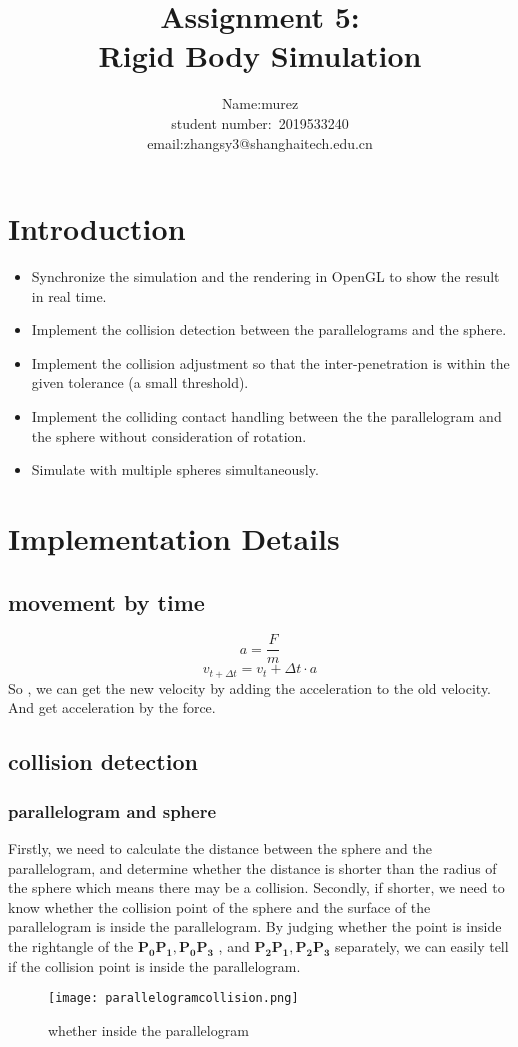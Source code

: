 \documentclass[acmtog]{acmart}
\title{Assignment 5:\\ {Rigid Body Simulation}}
\author{Name:\quad murez  \\ student number:\ 2019533240
\\email:\quad zhangsy3@shanghaitech.edu.cn}
\begin{document}
\maketitle

\vspace*{2 ex}

\section{Introduction}
\begin{itemize}
\item Synchronize the simulation and the rendering in OpenGL to show the result in real time.
\item Implement the collision detection between the parallelograms and the sphere.
\item Implement the collision adjustment so that the inter-penetration is within the given tolerance (a small threshold).
\item Implement the colliding contact handling between the the parallelogram and the sphere without consideration of rotation.
\item Simulate with multiple spheres simultaneously.
\end{itemize}
\section{Implementation Details}
\subsection{movement by time}

\[
	a = \frac{F}{m}
\]
\[
	v_{t+\Delta t} = v_{t} + \Delta t \cdot a
\]
So , we can get the new velocity by adding the acceleration to the old velocity. And get acceleration by the force.
\subsection{collision detection}
\subsubsection{parallelogram and sphere}
Firstly, we need to calculate the distance between the sphere and the parallelogram, and determine whether the distance is shorter than the radius of the sphere which means there may be a collision.
Secondly, if shorter, we need to know whether the collision point of the sphere and the surface of the parallelogram is inside the parallelogram.
By judging whether the point is inside the rightangle of the $\mathbf{P_{0}P_{1},P_{0}P_{3}}$
, and $\mathbf{P_{2}P_{1},P_{2}P_{3}}$
separately, we can easily tell if the collision point is inside the parallelogram.
\begin{figure}[h]
	\centering
	\texttt{[image: parallelogramcollision.png]}
	\caption{whether inside the parallelogram}
\end{figure}
\end{document}
